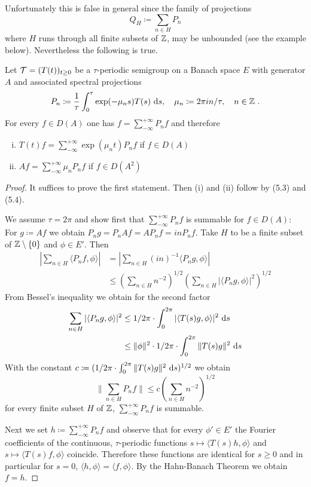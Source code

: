 Unfortunately this is false in general since the family of projections
\[
Q_{H} \coloneqq \sum_{n \in H} P_{n}
\]
where $H$ runs through all finite subsets of $\mathbb{Z}$, may be unbounded (see the example below).
Nevertheless the following is true.
\begin{theorem}\label{thm:a3-5.4}
Let $\mathcal{T} = (T(t))_{t \geq 0}$ be a $\tau$-periodic semigroup on a Banach space $E$ with generator $A$ and associated spectral projections
\[
P_{n} \coloneqq  \frac{1}{\tau}\int_{0}^{\tau} \exp(-\mu_{n}s)T(s) \, \mathop{}\!\mathrm{d}{s}, \quad \mu_{n} \coloneqq 2\pi in/\tau, \quad n \in \mathbb{Z} ~.
\]
For every $f \in D(A)$ one has $f = \sum_{-\infty}^{+\infty} P_{n}f$ and therefore
\begin{enumerate}[(i)]
\item 
$T(t)f = \sum_{-\infty}^{+\infty} \exp(\mu_{n}t)P_{n}f$ \quad if $f \in D(A)$

\item 
$Af = \sum_{-\infty}^{+\infty} \mu_{n}P_{n}f$ \quad if $f \in D(A^{2})$
\end{enumerate}
\end{theorem}
\begin{proof}
It suffices to prove the first statement. Then (i) and (ii) follow by (5.3) and (5.4).

We assume $\tau = 2\pi$ and show first that $\sum_{-\infty}^{+\infty} P_{n}f$ is summable for $f \in D(A)$: For $g \coloneqq Af$ we obtain $P_{n}g = P_{n}Af = AP_{n}f = inP_{n}f$.
Take $H$ to be a finite subset of $\mathbb{Z} \setminus \{0\}$ and $\phi \in E'$. Then
\begin{align*}
\left|\sum_{n \in H} \langle P_{n}f,\phi \rangle\right|
&= \left|\sum_{n \in H} (in)^{-1} \langle P_{n}g,\phi \rangle\right| \\
&\leq (\sum_{n \in H} n^{-2})^{1/2}(\sum_{n \in H} |\langle P_{n}g,\phi \rangle|^{2})^{1/2}
\end{align*}
From Bessel's inequality we obtain for the second factor
\begin{align*}
\sum_{n \in H} |\langle P_{n}g,\phi \rangle|^{2} &\leq 1/2\pi \cdot \int_{0}^{2\pi} |\langle T(s)g,\phi \rangle|^{2} \, \mathop{}\!\mathrm{d}{s} \\
&\leq \|\phi\|^{2} \cdot 1/2\pi \cdot \int_{0}^{2\pi} \|T(s)g\|^{2} \, \mathop{}\!\mathrm{d}{s}
\end{align*}
With the constant $c \coloneqq (1/2\pi \cdot \int_{0}^{2\pi} \|T(s)g\|^{2} \, \mathop{}\!\mathrm{d}{s})^{1/2}$ we obtain
\[
\|\sum_{n \in H} P_{n}f\| \leq c(\sum_{n \in H} n^{-2})^{1/2}
\]
for every finite subset $H$ of $\mathbb{Z}$, \ie $\sum_{-\infty}^{+\infty} P_{n}f$ is summable.

Next we set $h \coloneqq \sum_{-\infty}^{+\infty} P_{n}f$ and observe that for every $\phi' \in E'$ the Fourier coefficients of the continuous, $\tau$-periodic functions
$s \mapsto \langle T(s)h,\phi \rangle$ and $s \mapsto \langle T(s)f,\phi \rangle$
coincide.
Therefore these functions are identical for $s \geq 0$ and in particular for $s = 0$, \ie $\langle h,\phi \rangle = \langle f,\phi \rangle$.
By the Hahn-Banach Theorem we obtain $f = h$.
\end{proof}

